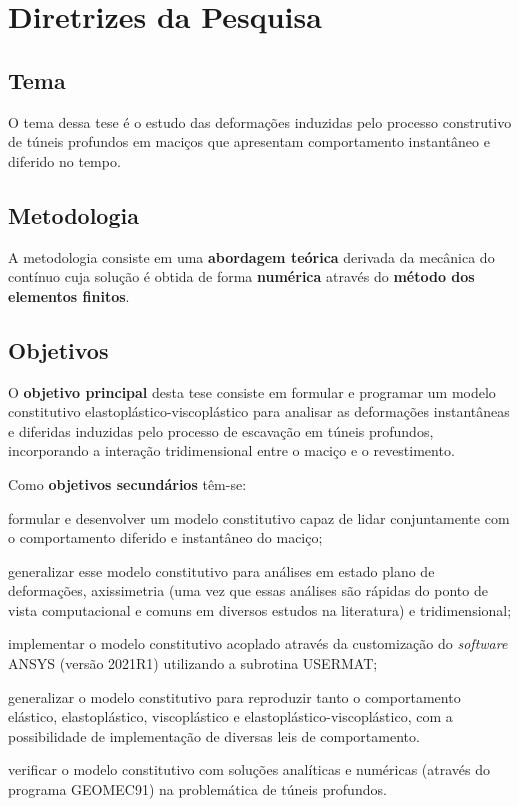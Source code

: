 \chapter{Diretrizes da Pesquisa}

\section{Tema}

O tema dessa tese é o estudo das deformações induzidas pelo processo construtivo de túneis profundos em maciços que apresentam comportamento instantâneo e diferido no tempo.

\section{Metodologia}

A metodologia consiste em uma \textbf{abordagem teórica} derivada da mecânica do contínuo cuja solução é obtida de forma \textbf{numérica} através do \textbf{método dos elementos finitos}.

\section{Objetivos}

O \textbf{objetivo principal} desta tese consiste em formular e programar um modelo constitutivo elastoplástico-viscoplástico para analisar as deformações instantâneas e diferidas induzidas pelo processo de escavação em túneis profundos, incorporando a interação tridimensional entre o maciço e o revestimento.

Como \textbf{objetivos secundários} têm-se:

\begin{alineas}
	 

	\item formular e desenvolver um modelo constitutivo capaz de lidar conjuntamente com o comportamento diferido e instantâneo do maciço;
	
	\item generalizar esse modelo constitutivo para análises em estado plano de deformações, axissimetria (uma vez que essas análises são rápidas do ponto de vista computacional e comuns em diversos estudos na literatura) e tridimensional;
	
	\item implementar o modelo constitutivo acoplado através da customização do \textit{software} ANSYS (versão 2021R1) utilizando a subrotina USERMAT;
	
	\item generalizar o modelo constitutivo para reproduzir tanto o comportamento elástico, elastoplástico, viscoplástico e elastoplástico-viscoplástico, com a possibilidade de implementação de diversas leis de comportamento.
	
	\item verificar o modelo constitutivo com soluções analíticas e numéricas (através do programa GEOMEC91) na problemática de túneis profundos.
	
\end{alineas}

